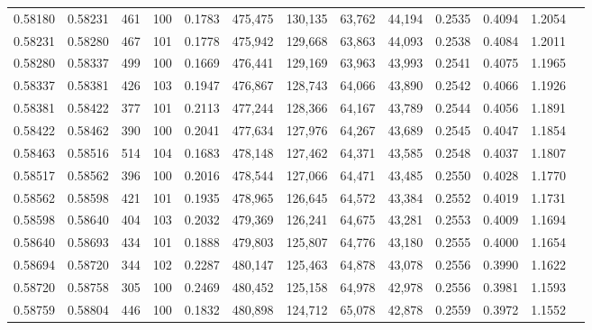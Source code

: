 \begin{tabular}{rrrrrrrrrrrrr}
0.58180 & 0.58231 &   461 & 100 &                                     0.1783 & 475,475 & 130,135 &  63,762 &  44,194 & 0.2535 & 0.4094 & 1.2054 \\
0.58231 & 0.58280 &   467 & 101 &                                     0.1778 & 475,942 & 129,668 &  63,863 &  44,093 & 0.2538 & 0.4084 & 1.2011 \\
0.58280 & 0.58337 &   499 & 100 &                                     0.1669 & 476,441 & 129,169 &  63,963 &  43,993 & 0.2541 & 0.4075 & 1.1965 \\
0.58337 & 0.58381 &   426 & 103 &                                     0.1947 & 476,867 & 128,743 &  64,066 &  43,890 & 0.2542 & 0.4066 & 1.1926 \\
0.58381 & 0.58422 &   377 & 101 &                                     0.2113 & 477,244 & 128,366 &  64,167 &  43,789 & 0.2544 & 0.4056 & 1.1891 \\
0.58422 & 0.58462 &   390 & 100 &                                     0.2041 & 477,634 & 127,976 &  64,267 &  43,689 & 0.2545 & 0.4047 & 1.1854 \\
0.58463 & 0.58516 &   514 & 104 &                                     0.1683 & 478,148 & 127,462 &  64,371 &  43,585 & 0.2548 & 0.4037 & 1.1807 \\
0.58517 & 0.58562 &   396 & 100 &                                     0.2016 & 478,544 & 127,066 &  64,471 &  43,485 & 0.2550 & 0.4028 & 1.1770 \\
0.58562 & 0.58598 &   421 & 101 &                                     0.1935 & 478,965 & 126,645 &  64,572 &  43,384 & 0.2552 & 0.4019 & 1.1731 \\
0.58598 & 0.58640 &   404 & 103 &                                     0.2032 & 479,369 & 126,241 &  64,675 &  43,281 & 0.2553 & 0.4009 & 1.1694 \\
0.58640 & 0.58693 &   434 & 101 &                                     0.1888 & 479,803 & 125,807 &  64,776 &  43,180 & 0.2555 & 0.4000 & 1.1654 \\
0.58694 & 0.58720 &   344 & 102 &                                     0.2287 & 480,147 & 125,463 &  64,878 &  43,078 & 0.2556 & 0.3990 & 1.1622 \\
0.58720 & 0.58758 &   305 & 100 &                                     0.2469 & 480,452 & 125,158 &  64,978 &  42,978 & 0.2556 & 0.3981 & 1.1593 \\
0.58759 & 0.58804 &   446 & 100 &                                     0.1832 & 480,898 & 124,712 &  65,078 &  42,878 & 0.2559 & 0.3972 & 1.1552 \\

\end{tabular}
